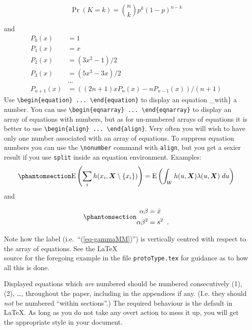 \documentclass[
  times,
  doublespace]{anzsauth}
\begin{document}
\[\Pr(K = k) = \binom{n}{k} p^k (1-p)^{n-k}\]

and \begin{align*}
P_0(x) &= 1 \\
P_1(x) &= x \\
P_2(x) &= (3x^2 - 1)/2 \\
P_3(x) &= (5x^3 - 3x)/2 \\
       & \ldots \\
P_{n+1}(x) &= ((2n+1)xP_n(x) - nP_{n-1}(x))/(n+1)
\end{align*} Use
\texttt{\textbackslash{}begin\{equation\}\ ...\ \textbackslash{}end\{equation\}}
to display an equation \_with\} a number. You can use
\texttt{\textbackslash{}begin\{eqnarray\}\ ...\ \textbackslash{}end\{eqnarray\}}
to display an array of equations with numbers, but as for un-numbered
arrays of equations it is better to use
\texttt{\textbackslash{}begin\{align\}\ ...\ \textbackslash{}end\{align\}}.
Very often you will wish to have only one number associated with an
array of equations. To suppress equation numbers you can use the
\texttt{\textbackslash{}nonumber} command with \texttt{align}, but you
get a sexier result if you use \texttt{split} inside an equation
environment. Examples: \begin{equation}\phantomsection\label{eq-GNZ}{
\E \left (\sum_i h(x_i,\bX \setminus \{x_i\}) \right )
= \E \left ( \int_W h(u,\bX) \lambda(u,\bX) \; du \right )
}\end{equation} and

\begin{equation}\phantomsection\label{eq-gammaMM}{\begin{split}
\alpha \beta &= \bar{x} \\
\alpha \beta^2 &= s^2 \;\; .
\end{split}
}\end{equation}

Note how the label (i.e.~``(\ref{eq-gammaMM})'') is vertically centred
with respect to the array of equations. See the \LaTeX\\
source for the foregoing example in the file \texttt{protoType.tex} for
guidance as to how all this is done.

\noindent Displayed equations which \emph{are} numbered should be
numbered consecutively (1), (2), \ldots, throughout the paper, including
in the appendices if any. (I.e. they should \emph{not} be numbered
``within sections''.) The required behaviour is the default in \LaTeX.
As long as you do not take any overt action to mess it up, you will get
the appropriate style in your document.
\end{document}

